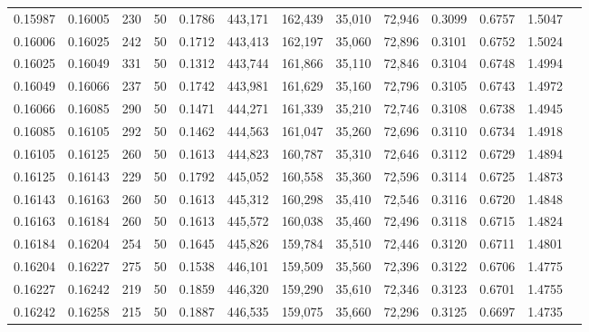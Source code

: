 \begin{tabular}{rrrrrrrrrrrrr}
0.15987 & 0.16005 &   230 &  50 &                                     0.1786 & 443,171 & 162,439 &  35,010 &  72,946 & 0.3099 & 0.6757 & 1.5047 \\
0.16006 & 0.16025 &   242 &  50 &                                     0.1712 & 443,413 & 162,197 &  35,060 &  72,896 & 0.3101 & 0.6752 & 1.5024 \\
0.16025 & 0.16049 &   331 &  50 &                                     0.1312 & 443,744 & 161,866 &  35,110 &  72,846 & 0.3104 & 0.6748 & 1.4994 \\
0.16049 & 0.16066 &   237 &  50 &                                     0.1742 & 443,981 & 161,629 &  35,160 &  72,796 & 0.3105 & 0.6743 & 1.4972 \\
0.16066 & 0.16085 &   290 &  50 &                                     0.1471 & 444,271 & 161,339 &  35,210 &  72,746 & 0.3108 & 0.6738 & 1.4945 \\
0.16085 & 0.16105 &   292 &  50 &                                     0.1462 & 444,563 & 161,047 &  35,260 &  72,696 & 0.3110 & 0.6734 & 1.4918 \\
0.16105 & 0.16125 &   260 &  50 &                                     0.1613 & 444,823 & 160,787 &  35,310 &  72,646 & 0.3112 & 0.6729 & 1.4894 \\
0.16125 & 0.16143 &   229 &  50 &                                     0.1792 & 445,052 & 160,558 &  35,360 &  72,596 & 0.3114 & 0.6725 & 1.4873 \\
0.16143 & 0.16163 &   260 &  50 &                                     0.1613 & 445,312 & 160,298 &  35,410 &  72,546 & 0.3116 & 0.6720 & 1.4848 \\
0.16163 & 0.16184 &   260 &  50 &                                     0.1613 & 445,572 & 160,038 &  35,460 &  72,496 & 0.3118 & 0.6715 & 1.4824 \\
0.16184 & 0.16204 &   254 &  50 &                                     0.1645 & 445,826 & 159,784 &  35,510 &  72,446 & 0.3120 & 0.6711 & 1.4801 \\
0.16204 & 0.16227 &   275 &  50 &                                     0.1538 & 446,101 & 159,509 &  35,560 &  72,396 & 0.3122 & 0.6706 & 1.4775 \\
0.16227 & 0.16242 &   219 &  50 &                                     0.1859 & 446,320 & 159,290 &  35,610 &  72,346 & 0.3123 & 0.6701 & 1.4755 \\
0.16242 & 0.16258 &   215 &  50 &                                     0.1887 & 446,535 & 159,075 &  35,660 &  72,296 & 0.3125 & 0.6697 & 1.4735 \\

\end{tabular}
